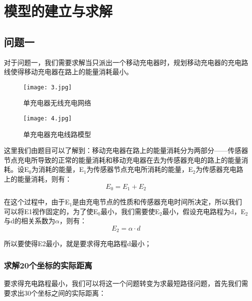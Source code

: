 \documentclass{article}
\begin{document}
\newpage                                                    %
\section{模型的建立与求解}
\subsection{问题一}
对于问题一，我们需要求解当只派出一个移动充电器时，规划移动充电器的充电路线使得移动充电器在路上的能量消耗最小。\\
\vspace{0.5ex}
\begin{figure}[hbt]
	\begin{minipage}[t]{0.5\textwidth}
		\centering
		\texttt{[image: 3.jpg]}
		\caption{单充电器无线充电网络}
	\end{minipage}
	\qquad
	\begin{minipage}[t]{0.5\textwidth}
		\centering
		\texttt{[image: 4.jpg]}
		\caption{单充电器充电线路模型}
	\end{minipage}
\end{figure}
\vspace{0.5ex}

这里我们由题目可以了解到：移动充电器在路上的能量消耗分为两部分——传感器节点充电所导致的正常的能量消耗和移动充电器在去为传感器充电的路上的能量消耗。设E$_0$为消耗的能量，E$_1$为传感器节点充电所消耗的能量，E$_2$为传感器充电路上的能量消耗，则有：
\begin{equation}
    E_0 = E_1 + E_2     %
    \tag{1}             %
\end{equation}      %

在这个过程中，由于E$_1$是由充电节点的性质和传感器充电时间所决定，所以我们可以将E1视作固定的，为了使E$_0$最小，我们需要使E$_2$最小，假设充电路程为d，E$_2$与d的相关系数为$\alpha$，则有：
\begin{equation}
    E_2 = \alpha \cdot d   %
    \tag{2}             
\end{equation}      

所以要使得E2最小，就是要求得充电路程d最小；


\subsubsection{求解20个坐标的实际距离}
要求得充电路程最小，我们可以将这一个问题转变为求最短路径问题，首先我们需要求出30个坐标之间的实际距离\cite{ref4}：
\end{document}
